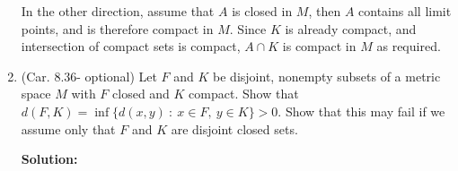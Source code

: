 \documentclass{article}
\begin{document}
\begin{enumerate}
In the other direction, assume that $A$ is closed in $M$, then $A$ contains
all limit points, and is therefore compact in $M$. Since $K$ is already
compact, and intersection of compact sets is compact, $A \cap K$ is compact 
in $M$ as required.


\item (Car. 8.36- optional) Let $F$ and $K$ be disjoint, nonempty subsets of a metric space $M$ with $F$ closed and $K$ compact. Show that $d(F,K) = \inf \{ d(x,y)\ :\ x \in F,\ y \in K \} > 0$. Show that this may fail if we assume only that $F$ and $K$ are disjoint closed sets.

\textbf{Solution:} 


\end{enumerate}
\end{document}
